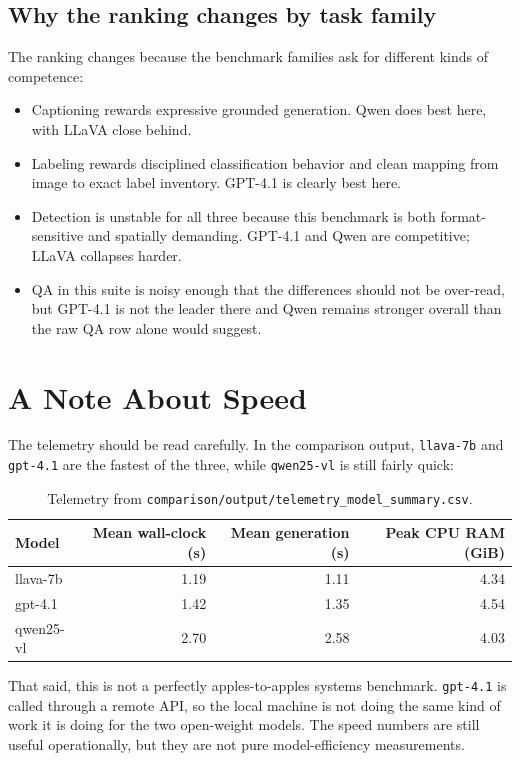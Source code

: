 \documentclass[11pt]{article}
\begin{document}
\subsection{Why the ranking changes by task family}
The ranking changes because the benchmark families ask for different kinds of competence:
\begin{itemize}[leftmargin=*]
    \item Captioning rewards expressive grounded generation. Qwen does best here, with LLaVA close behind.
    \item Labeling rewards disciplined classification behavior and clean mapping from image to exact label inventory. GPT-4.1 is clearly best here.
    \item Detection is unstable for all three because this benchmark is both format-sensitive and spatially demanding. GPT-4.1 and Qwen are competitive; LLaVA collapses harder.
    \item QA in this suite is noisy enough that the differences should not be over-read, but GPT-4.1 is not the leader there and Qwen remains stronger overall than the raw QA row alone would suggest.
\end{itemize}

\section{A Note About Speed}
The telemetry should be read carefully. In the comparison output, \texttt{llava-7b} and \texttt{gpt-4.1} are the fastest of the three, while \texttt{qwen25-vl} is still fairly quick:

\begin{table}[H]
\centering
\caption{Telemetry from \texttt{comparison/output/telemetry\_model\_summary.csv}.}
\begin{tabular}{>{\ttfamily}lrrr}
\toprule
Model & Mean wall-clock (s) & Mean generation (s) & Peak CPU RAM (GiB) \\
\midrule
llava-7b & 1.19 & 1.11 & 4.34 \\
gpt-4.1 & 1.42 & 1.35 & 4.54 \\
qwen25-vl & 2.70 & 2.58 & 4.03 \\
\bottomrule
\end{tabular}
\end{table}

\noindent
That said, this is not a perfectly apples-to-apples systems benchmark. \texttt{gpt-4.1} is called through a remote API, so the local machine is not doing the same kind of work it is doing for the two open-weight models. The speed numbers are still useful operationally, but they are not pure model-efficiency measurements.
\end{document}
